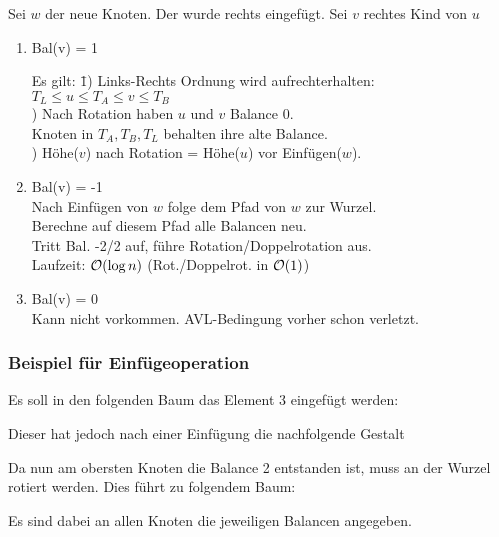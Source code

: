             Sei $w$ der neue Knoten. Der wurde rechts eingefügt. Sei $v$ rechtes Kind von $u$\\
            \begin{enumerate}
                \item Bal(v) = 1

                \begin{tabbing}
                    Es gilt: \= 1) Links-Rechts Ordnung wird aufrechterhalten:\\
                    \> $T_{L} \leq u \leq T_{A} \leq v \leq T_{B}$\\
                    ) Nach Rotation haben $u$ und $v$ Balance 0.\\
                    \> Knoten in $T_{A}, T_{B}, T_{L}$ behalten ihre alte Balance.\\
                    ) Höhe($v$) nach Rotation = Höhe($u$) vor Einfügen($w$).
                \end{tabbing}
                \item Bal(v) = -1\\
                Nach Einfügen von $w$ folge dem Pfad von $w$ zur Wurzel.\\
                Berechne auf diesem Pfad alle Balancen neu. \\
                Tritt Bal. -2/2 auf, führe Rotation/Doppelrotation aus.\\
                Laufzeit: $\mathcal{O}(\log n)$ (Rot./Doppelrot. in $\mathcal{O}(1)$)
                \item Bal(v) = 0\\
                Kann nicht vorkommen. AVL-Bedingung vorher schon verletzt.
            \end{enumerate}
            
            \subsubsection{Beispiel für Einfügeoperation}
                Es soll in den folgenden Baum das Element 3 eingefügt werden:
                \begin{center}
                    
                \end{center}
                Dieser hat jedoch nach einer Einfügung die nachfolgende Gestalt
                \begin{center}
                    
                \end{center}
                Da nun am obersten Knoten die Balance 2 entstanden ist, muss an der Wurzel rotiert werden. Dies führt zu folgendem Baum:
                \begin{center}
                    
                \end{center}
                Es sind dabei an allen Knoten die jeweiligen Balancen angegeben.

